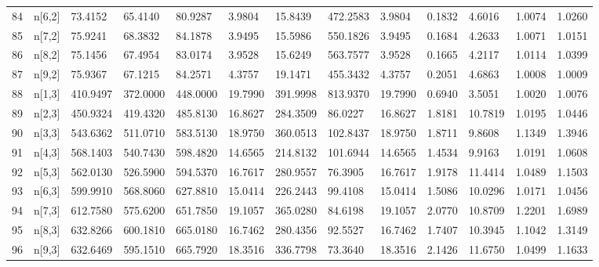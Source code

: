 \begin{table}[ht]
\begin{tabular}{rllllllllllll}
  84 & n[6,2] &   73.4152 &   65.4140 &   80.9287 &    3.9804 &      15.8439 &  472.2583 &    3.9804 &  0.1832 &  4.6016 & 1.0074 & 1.0260 \\ 
  85 & n[7,2] &   75.9241 &   68.3832 &   84.1878 &    3.9495 &      15.5986 &  550.1826 &    3.9495 &  0.1684 &  4.2633 & 1.0071 & 1.0151 \\ 
  86 & n[8,2] &   75.1456 &   67.4954 &   83.0174 &    3.9528 &      15.6249 &  563.7577 &    3.9528 &  0.1665 &  4.2117 & 1.0114 & 1.0399 \\ 
  87 & n[9,2] &   75.9367 &   67.1215 &   84.2571 &    4.3757 &      19.1471 &  455.3432 &    4.3757 &  0.2051 &  4.6863 & 1.0008 & 1.0009 \\ 
  88 & n[1,3] &  410.9497 &  372.0000 &  448.0000 &   19.7990 &     391.9998 &  813.9370 &   19.7990 &  0.6940 &  3.5051 & 1.0020 & 1.0076 \\ 
  89 & n[2,3] &  450.9324 &  419.4320 &  485.8130 &   16.8627 &     284.3509 &   86.0227 &   16.8627 &  1.8181 & 10.7819 & 1.0195 & 1.0446 \\ 
  90 & n[3,3] &  543.6362 &  511.0710 &  583.5130 &   18.9750 &     360.0513 &  102.8437 &   18.9750 &  1.8711 &  9.8608 & 1.1349 & 1.3946 \\ 
  91 & n[4,3] &  568.1403 &  540.7430 &  598.4820 &   14.6565 &     214.8132 &  101.6944 &   14.6565 &  1.4534 &  9.9163 & 1.0191 & 1.0608 \\ 
  92 & n[5,3] &  562.0130 &  526.5900 &  594.5370 &   16.7617 &     280.9557 &   76.3905 &   16.7617 &  1.9178 & 11.4414 & 1.0489 & 1.1503 \\ 
  93 & n[6,3] &  599.9910 &  568.8060 &  627.8810 &   15.0414 &     226.2443 &   99.4108 &   15.0414 &  1.5086 & 10.0296 & 1.0171 & 1.0456 \\ 
  94 & n[7,3] &  612.7580 &  575.6200 &  651.7850 &   19.1057 &     365.0280 &   84.6198 &   19.1057 &  2.0770 & 10.8709 & 1.2201 & 1.6989 \\ 
  95 & n[8,3] &  632.8266 &  600.1810 &  665.0180 &   16.7462 &     280.4356 &   92.5527 &   16.7462 &  1.7407 & 10.3945 & 1.1042 & 1.3149 \\ 
  96 & n[9,3] &  632.6469 &  595.1510 &  665.7920 &   18.3516 &     336.7798 &   73.3640 &   18.3516 &  2.1426 & 11.6750 & 1.0499 & 1.1633 \\ 
   \hline
\end{tabular}
\end{table}
